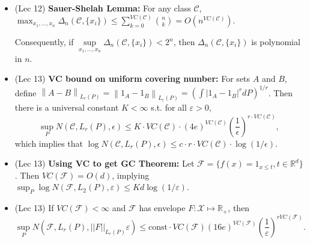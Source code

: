 \documentclass[twoside]{article}
\newcommand{\dis}{\displaystyle}
\newcommand{\norm}[1]{\left\|{#1}\right\|} %
\newcommand\bbR{\mathbb{R}}
\newcommand\calF{\mathcal{F}}
\newcommand\calX{\mathcal{X}}
\def\eps{\varepsilon}
\begin{document}
\begin{itemize}
\item (Lec 12) \textbf{Sauer-Shelah Lemma:} For any class $\mathcal{C}$, $\dis\max_{x_1,\dots, x_n} \Delta_n(\mathcal{C}, \{x_i\}) \leq \sum_{k=0}^{VC(\mathcal{C})} \binom{n}{k} = O(n^{VC(\mathcal{C})})$.

Consequently, if $\sup\limits_{x_1,\ldots, x_n} \Delta_n(\mathcal{C}, \{x_i\}) < 2^n$, then $\Delta_n(\mathcal{C}, \{x_i\})$ is polynomial in $n$.

\item (Lec 13) \textbf{VC bound on uniform covering number:} For sets $A$ and $B$, define $\norm{A-B}_{L_r(P)} = \norm{1_A - 1_B}_{L_r(P)} = \left( \dis\int |1_A - 1_B|^r dP \right)^{1/r}$. Then there is a universal constant $K < \infty$ s.t. for all $\eps > 0$, 
\[ \sup_{P}N(\mathcal{C},L_r(P),\epsilon) \leq K \cdot VC(\mathcal{C}) \cdot (4e)^{VC(\mathcal{C})}\left(\frac{1}{\epsilon}\right)^{r \cdot VC(\mathcal{C})},
\]
which implies that $\log N(\mathcal{C},L_r(P),\epsilon) \leq c \cdot r \cdot VC(\mathcal{C}) \cdot \log(1/\epsilon)$.

\item (Lec 13) \textbf{Using VC to get GC Theorem:} Let $\calF = \{f(x)=1_{x \leq t}, t \in \bbR^d\}$. Then $VC(\calF) = O(d)$, implying $\dis\sup_P \log N(\calF, L_2(P), \eps) \leq K d \log (1/\eps)$.

\item (Lec 13) If $VC(\calF)<\infty$ and $\calF$ has envelope $F:\calX \mapsto \bbR_+$, then
\[ \sup_P N(\calF,L_r(P),||F||_{L_r(P)}\eps)\leq \text{const} \cdot VC(\calF) (16e)^{VC(\calF)}(\frac{1}{\eps})^{rVC(\calF)}. \]

\end{itemize}

\end{document}
